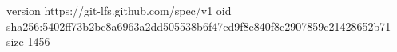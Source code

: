 version https://git-lfs.github.com/spec/v1
oid sha256:5402ff73b2bc8a6963a2dd505538b6f47cd9f8e840f8c2907859c21428652b71
size 1456
